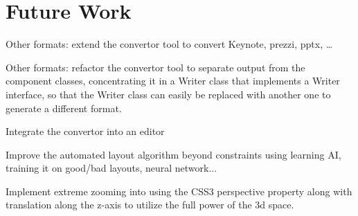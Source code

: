   \section{Future Work}
   \label{future}


   Other formats: extend the convertor tool to convert Keynote, prezzi, pptx,
   \ldots

   Other formats: refactor the convertor tool to separate output from the
   component classes, concentrating it in a Writer class that implements a
   Writer interface, so that the Writer class can easily be replaced with
   another one to generate a different format.

   Integrate the convertor into an \mxp editor

   Improve the automated layout algorithm beyond constraints using learning AI,
   training it on good/bad layouts, neural network...

   Implement extreme zooming into \mxp using the CSS3 perspective property
   along with translation along the z-axis to utilize the full power of the 3d
   space.

